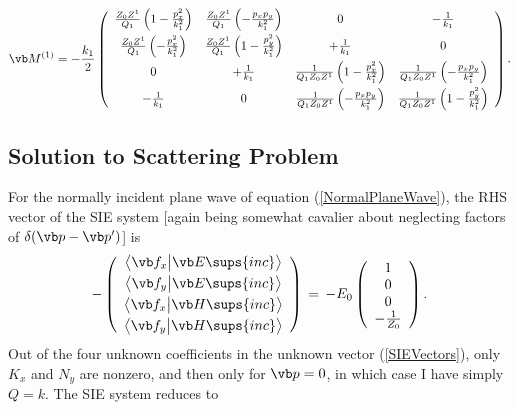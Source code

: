 \documentclass{article}
\renewcommand{\inp}[2]{ \big\langle #1 \big| #2 \big\rangle}
\begin{document}
$$ \vb M^{(1)}=
   -\frac{k_1}{2}
    \left(\begin{array}{cccc}
    \frac{Z_0Z^1}{Q_1}\left(1-\frac{p_x^2}{k_1^2}\right)
  &
    \frac{Z_0Z^1}{Q_1}\left(-\frac{p_xp_y}{k_1^2}\right)
  & 0 
  & -\frac{1}{k_1}
 \\[6pt]
    \frac{Z_0Z^1}{Q_1}\left(-\frac{p_x^2}{k_1^2}\right)
  &
    \frac{Z_0Z^1}{Q_1}\left(1-\frac{p_y^2}{k_1^2}\right)
  & +\frac{1}{k_1}
  & 0 
 \\[6pt]
    0
  & +\frac{1}{k_1}
  & \frac{1}{Q_1 Z_0 Z^1} \left(1-\frac{p_x^2}{k_1^2}\right)
  & \frac{1}{Q_1 Z_0 Z^1} \left(-\frac{p_xp_y }{k_1^2}\right)
 \\[6pt]
   -\frac{1}{k_1}
  & 0
  & \frac{1}{Q_1 Z_0 Z^1} \left(-\frac{p_xp_y}{k_1^2}\right)
  & \frac{1}{Q_1 Z_0 Z^1} \left(1-\frac{p_y^2}{k_1^2}\right)
   \end{array}\right).
$$

\subsection*{Solution to Scattering Problem}
For the normally incident plane wave of equation 
(\ref{NormalPlaneWave}), the RHS vector of the SIE system 
[again being somewhat cavalier about neglecting 
factors of $\delta(\vb p-\vb p^\prime)$] is 
$$-
 \left(\begin{array}{c}
 \inp{\vb f_{x}}{\vb E\sups{inc}} \\[3pt]
 \inp{\vb f_{y}}{\vb E\sups{inc}} \\[3pt]
 \inp{\vb f_{x}}{\vb H\sups{inc}} \\[3pt]
 \inp{\vb f_{y}}{\vb H\sups{inc}}
 \end{array}\right)
\,=\,
  -E_0 
 \left(\begin{array}{c}
 1 \\ 
 0 \\ 
 0 \\ 
 -\frac{1}{Z_0}
 \end{array}\right).
$$
Out of the four unknown coefficients in the unknown
vector (\ref{SIEVectors}), only $K_x$ and $N_y$ are 
nonzero, and then only for $\vb p=0$, in which
case I have simply $Q=k$.
The SIE system reduces to 
\end{document}
